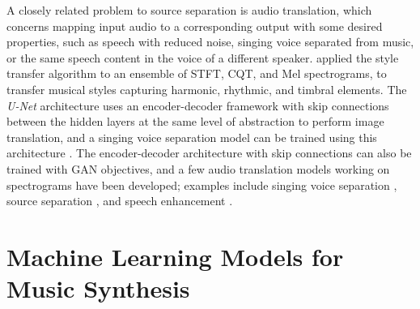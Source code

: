 A closely related problem to source separation is audio translation, which concerns mapping input audio to a corresponding output with some desired properties, such as speech with reduced noise, singing voice separated from music, or the same speech content in the voice of a different speaker.
 applied the style transfer algorithm \cite{gatys2015style} to an ensemble of STFT, CQT, and Mel spectrograms, to transfer musical styles capturing harmonic, rhythmic, and timbral elements.
The \emph{U-Net} architecture \cite{ronneberger2015unet} uses an encoder-decoder framework with skip connections between the hidden layers at the same level of abstraction to perform image translation, and a singing voice separation model can be trained using this architecture \cite{jansson2017separation}.
The encoder-decoder architecture with skip connections can also be trained with GAN objectives, and a few audio translation models working on spectrograms have been developed; examples include singing voice separation \cite{fan2017svsgan, stoller2017separation}, source separation \cite{subakan2017gan}, and speech enhancement \cite{pascual2017segan, donahue2017segan}.



\section{Machine Learning Models for Music Synthesis}

